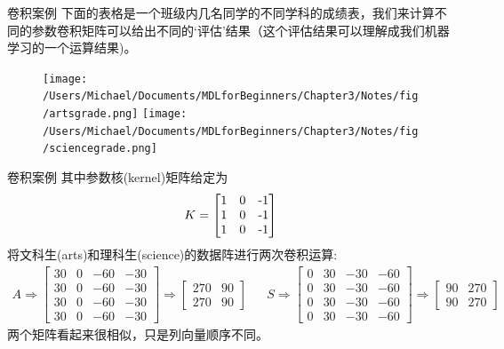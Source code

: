\documentclass[handout]{beamer}
\begin{document}
\begin{frame}{卷积案例}
下面的表格是一个班级内几名同学的不同学科的成绩表，我们来计算不同的参数卷积矩阵可以给出不同的`评估'结果（这个评估结果可以理解成我们机器学习的一个运算结果)。
\begin{figure}[H]
	\centering
	\texttt{[image: /Users/Michael/Documents/MDLforBeginners/Chapter3/Notes/fig/artsgrade.png]}
	\texttt{[image: /Users/Michael/Documents/MDLforBeginners/Chapter3/Notes/fig/sciencegrade.png]}
\end{figure}
\end{frame}

\begin{frame}{卷积案例}
其中参数核(kernel)矩阵给定为
\begin{align*}
	K = \begin{bmatrix}
		1 & 0 & $-$1$$ \\
		1 & 0 & $-$1$$  \\
		1 & 0 & $-$1$$  
	\end{bmatrix}
\end{align*}
将文科生(arts)和理科生(science)的数据阵进行两次卷积运算:
{\footnotesize
\begin{align*}
	A \Rightarrow \begin{bmatrix}
		30 &    0  &   -60  &    -30 \\
       30  &     0  &    -60  &    -30   \\        
       30  &     0  &    -60  &   -30 \\
       30  &    0  &    -60  &   -30 
	\end{bmatrix} \Rightarrow \begin{bmatrix}
		270 & 90 \\
		270 & 90 
	\end{bmatrix} & & 	S \Rightarrow \begin{bmatrix}
	   0 & 30 & -30 & -60 \\
       0 & 30 &  -30 & -60 \\
        0 & 30 &  -30 & -60 \\
       0 & 30 &  -30 &  -60
	\end{bmatrix} \Rightarrow \begin{bmatrix}
		90 & 270 \\
		90 & 270 
	\end{bmatrix}
\end{align*}
}
两个矩阵看起来很相似，只是列向量顺序不同。
\end{frame}
\end{document}
